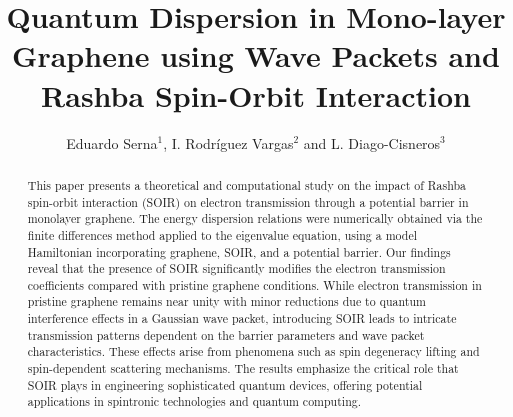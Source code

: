 \documentclass{../assets/templates/iopjournal}
\begin{document}

    \title{Quantum Dispersion in Mono-layer Graphene using Wave Packets and Rashba Spin-Orbit Interaction}
    
    \author{Eduardo Serna$^1$, I. Rodr\'iguez Vargas$^2$ and L. Diago-Cisneros$^3$}
    
       
    
    
    
    

    \begin{abstract}
        This paper presents a theoretical and computational study on the impact of Rashba spin-orbit interaction (SOIR) on electron transmission through a potential barrier in monolayer graphene.
        The energy dispersion relations were numerically obtained via the finite differences method applied to the eigenvalue equation, using a model Hamiltonian incorporating graphene, SOIR, and a potential barrier.
        Our findings reveal that the presence of SOIR significantly modifies the electron transmission coefficients compared with pristine graphene conditions.
        While electron transmission in pristine graphene remains near unity with minor reductions due to quantum interference effects in a Gaussian wave packet, introducing SOIR leads to intricate transmission patterns dependent on the barrier parameters and wave packet characteristics.
        These effects arise from phenomena such as spin degeneracy lifting and spin-dependent scattering mechanisms.
        The results emphasize the critical role that SOIR plays in engineering sophisticated quantum devices, offering potential applications in spintronic technologies and quantum computing.
    \end{abstract}
\end{document}
